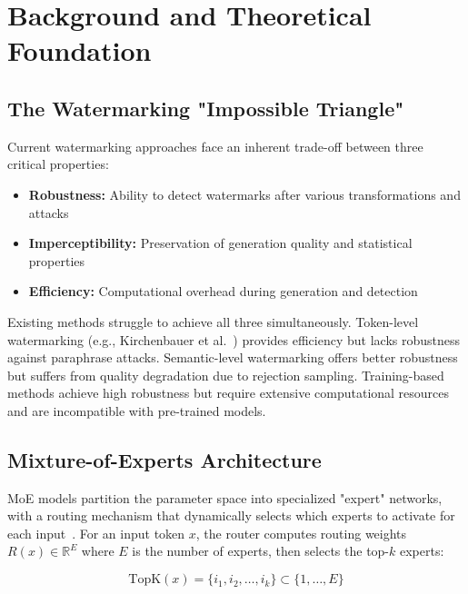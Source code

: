 \documentclass[letterpaper,twocolumn,10pt]{article}
\begin{document}
\section{Background and Theoretical Foundation}

\subsection{The Watermarking "Impossible Triangle"}

Current watermarking approaches face an inherent trade-off between three critical properties:

\begin{itemize}
\item \textbf{Robustness:} Ability to detect watermarks after various transformations and attacks
\item \textbf{Imperceptibility:} Preservation of generation quality and statistical properties  
\item \textbf{Efficiency:} Computational overhead during generation and detection
\end{itemize}

Existing methods struggle to achieve all three simultaneously. Token-level watermarking (e.g., Kirchenbauer et al.~\cite{kirchenbauer2023watermark}) provides efficiency but lacks robustness against paraphrase attacks. Semantic-level watermarking offers better robustness but suffers from quality degradation due to rejection sampling. Training-based methods achieve high robustness but require extensive computational resources and are incompatible with pre-trained models.

\subsection{Mixture-of-Experts Architecture}

MoE models partition the parameter space into specialized "expert" networks, with a routing mechanism that dynamically selects which experts to activate for each input~\cite{shazeer2017outrageously}. For an input token $x$, the router computes routing weights $R(x) \in \mathbb{R}^E$ where $E$ is the number of experts, then selects the top-$k$ experts:

\begin{equation}
\text{TopK}(x) = \{i_1, i_2, \ldots, i_k\} \subset \{1, \ldots, E\}
\end{equation}
\end{document}
